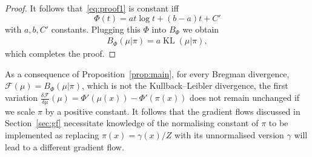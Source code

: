 \documentclass{article}
\newcommand{\KL}{\mathop{\mathrm{KL}}\nolimits}
\newcommand{\cM}{\mathcal M}
\newcommand{\cF}{\mathcal F}
\newcommand{\R}{\mathbb R}
\begin{document}
\begin{proof}


It follows that~\eqref{eq:proof1} is constant iff $$ \Phi(t ) = a t \log t+(b-a)t+C'$$ with $a, b, C'$ constants.
Plugging this $\Phi$ into $B_\Phi$ we obtain
\begin{align*}
    B_\Phi(\mu|\pi) = a\KL(\mu|\pi),
\end{align*}
which completes the proof.
\end{proof}

As a consequence of Proposition~\ref{prop:main}, for every Bregman divergence, $\cF(\mu) = B_{\Phi}(\mu|\pi)$, which is not the Kullback--Leibler divergence, the first variation $\frac{\delta \cF}{\delta \mu}(\mu)= \Phi'(\mu(x))-\Phi'(\pi(x))$ does not remain unchanged if we scale $\pi$
by a positive constant. It follows that the gradient flows discussed in Section~\ref{sec:gf} necessitate knowledge of the normalising constant of $\pi$ to be implemented as replacing $\pi(x)=\gamma(x)/Z$ with its unnormalised version $\gamma$ will lead to a different gradient flow.




\end{document}
